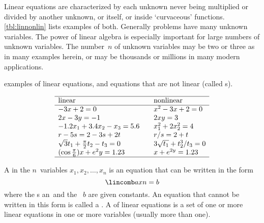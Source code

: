 Linear equations are characterized by each unknown never being multiplied or divided by another unknown, or itself, or inside `curvaceous' functions.  
\cref{tbl:linnonlin} lists examples of both.
Generally problems have many unknown variables.
The power of linear algebra is especially important for large numbers of unknown variables.
The number~\(n\) of unknown variables may be two or three as in many examples herein, or may be thousands or millions in many modern applications.
\begin{table}[btp]
\caption{examples of linear equations, and equations that are not linear (called s).}
\label{tbl:linnonlin}
\begin{equation*}
\begin{array}{l@{\qquad}l}\hline
\text{linear}&\text{nonlinear}\\\hline
-3x+2=0 & x^2-3x+2=0 \\
2x-3y=-1 & 2xy=3\\
-1.2x_1+3.4x_2-x_3=5.6 & x_1^2+2x_2^2=4 \\
r-5s=2-3s+2t & r/s=2+t \\
\sqrt3t_1+\frac\pi2t_2-t_3=0 & 3\sqrt{t_1}+t_2^3/t_3=0\\
(\cos\frac\pi6)x+e^2y=1.23 & x+e^{2y}=1.23\\
\hline
\end{array}
\end{equation*}
\end{table}




\begin{definition} \label{def:lineqn} 
A  in the \(n\)~variables \(x_1,x_2,\ldots,x_n\) is an equation that can be written in the form
\begin{equation*}
\lincomb axn=b
\end{equation*}
where the s \hlist an\ and the ~\(b\) are given  constants.
An equation that cannot be written in this form is called a .
A  of linear equations is a set of one or more linear equations in one or more variables (usually more than one).
\end{definition}


